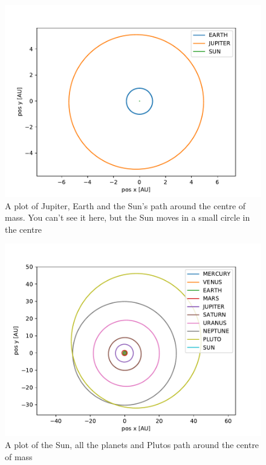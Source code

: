 \documentclass[a4paper]{article}
\begin{document}
	\begin{figure}[h!]
		\centering 
		\includegraphics[scale=0.7]{../opp_f0.pdf}
		\caption{A plot of Jupiter, Earth and the Sun's path around the centre of mass. You can't see it here, but the Sun moves in a small circle in the centre}
		\label{f_0}
	\end{figure}
	
	\begin{figure}[h!]
		\centering 
		\includegraphics[scale=0.7]{../opp_f1.pdf}
		\caption{A plot of the Sun, all the planets and Plutos path around the centre of mass}
		\label{f_1_0}
	\end{figure}
	
\end{document}
